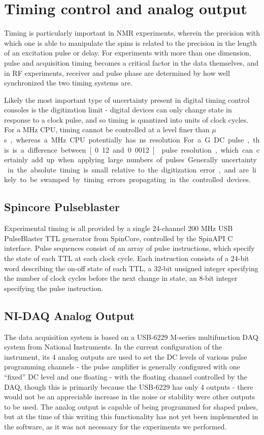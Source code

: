 \documentclass[PaulGanssle-Thesis.tex]{subfiles}
\begin{document}
\section{Timing control and analog output}
\label{console.timing}
Timing is particularly important in NMR experiments, wherein the precision with which one is able to manipulate the spins is related to the precision in the length of an excitation pulse or delay. For experiments with more than one dimension, pulse and acquisition timing becomes a critical factor in the data themselves, and in RF experiments, receiver and pulse phase are determined by how well synchronized the two timing systems are.

Likely the most important type of uncertainty present in digital timing control consoles is the digitization limit - digital devices can only change state in response to a clock pulse, and so timing is quantized into units of clock cycles. For a \unit[1]{MHz} CPU, timing cannot be controlled at a level finer than \unit[1]{$\mu$s}, whereas a \unit[100]{MHz} CPU potentially has \unit[10]{ns} resolution. For a \unit[1]{G} DC pulse, this is a difference between \unit[0.12 and 0.0012]{\degsym} pulse resolution, which can certainly add up when applying large numbers of pulses. Generally uncertainty in the absolute timing is small relative to the digitization error, and are likely to be swamped by timing errors propagating in the controlled devices. 

\subsection{Spincore Pulseblaster}
\label{console.timing.pulseblaster}
Experimental timing is all provided by a single 24-channel 200 MHz USB PulseBlaster TTL generator from SpinCore, controlled by the SpinAPI C interface. Pulse sequences consist of an array of pulse instructions, which specify the state of each TTL at each clock cycle. Each instruction consists of a 24-bit word describing the on-off state of each TTL, a 32-bit unsigned integer specifying the number of clock cycles before the next change in state, an 8-bit integer specifying the pulse instruction.

\subsection{NI-DAQ Analog Output}
\label{console.timing.nidaq}
The data acquisition system is based on a USB-6229 M-series multifunction DAQ system from National Instruments. In the current configuration of the instrument, its 4 analog outputs are used to set the DC levels of various pulse programming channels - the pulse amplifier is generally configured with one ``fixed'' DC level and one floating - with the floating channel controlled by the DAQ, though this is primarily because the USB-6229 has only 4 outputs - there would not be an appreciable increase in the noise or stability were other outputs to be used. The analog output is capable of being programmed for shaped pulses, but at the time of this writing this functionality has not yet been implemented in the software, as it was not necessary for the experiments we performed.
\end{document}
